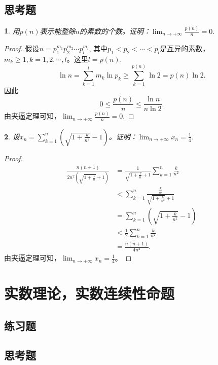 \documentclass[utf8]{book}
\newtheorem{example}{}[section]             %
\begin{document}
\subsection{思考题}
\begin{example}
用$p(n)$表示能整除$n$的素数的个数。证明：$\displaystyle \lim_{n\to +\infty}\frac{p(n)}{n} = 0.$
\end{example}
\begin{proof}
假设$n=p_1^{m_1}p_2^{m_2}\cdots p_l^{m_l}$, 其中$p_1 < p_2 <\cdots < p_l$是互异的素数，$m_k \geq 1, k=1,2,\cdots, l$。这里$l=p(n)$.
$$\ln{n} = \displaystyle\sum_{k=1}^{l}m_k\ln{p_k} \geq \displaystyle\sum_{k=1}^{p(n)}\ln{2}=p(n)\ln{2}.$$
因此
$$0 \leq \frac{p(n)}{n} \leq \frac{\ln{n}}{n\ln{2}}.$$
由夹逼定理可知，$\displaystyle \lim_{n\to +\infty}\frac{p(n)}{n} = 0.$

\end{proof}
\begin{example}
设$x_n = \displaystyle \sum_{k=1}^n\left(\sqrt{1+\frac{k}{n^2}} -1\right)$。证明：$\displaystyle \lim_{n\to +\infty}x_n = \frac{1}{4}$.
\end{example}
\begin{proof}
\begin{equation*}
\begin{split}
\frac{n(n+1)}{2n^2\left(\sqrt{1 +\frac{1}{n}} + 1\right)}&= \frac{1}{\sqrt{1 +\frac{1}{n}} + 1}\displaystyle \sum_{k=1}^n\frac{k}{n^2} \\&< \displaystyle \sum_{k=1}^n\frac{\frac{k}{n^2}}{\sqrt{1+\frac{k}{n^2}}+1} \\&= \displaystyle\sum_{k=1}^n\left(\sqrt{1+\frac{k}{n^2}}-1\right) \\
&< \frac{1}{2}\displaystyle \sum_{k=1}^n\frac{k}{n^2}\\&= \frac{n(n+1)}{4n^2}.
\end{split}
\end{equation*}
由夹逼定理可知，$\displaystyle \lim_{n\to +\infty}x_n = \frac{1}{4}$。
\end{proof}
\section{实数理论，实数连续性命题}
\subsection{练习题}
\subsection{思考题}
\end{document}
